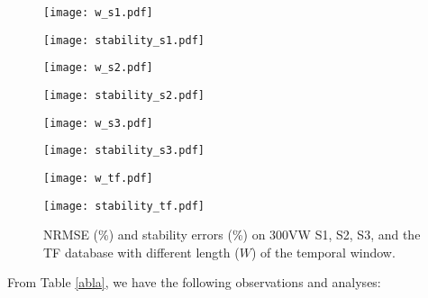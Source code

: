 \documentclass[review]{elsarticle}
\begin{document}
\begin{figure}[h]
\centering	
\begin{minipage}{0.48\linewidth}
	\centering
	\texttt{[image: w\_s1.pdf]}
\end{minipage}%
\begin{minipage}{0.48\linewidth}
	\centering
	\texttt{[image: stability\_s1.pdf]}
\end{minipage}%

\begin{minipage}{0.48\linewidth}
	\centering
	\texttt{[image: w\_s2.pdf]}
\end{minipage}
\begin{minipage}{0.48\linewidth}
	\centering
	\texttt{[image: stability\_s2.pdf]}
\end{minipage}

\begin{minipage}{0.48\linewidth}
	\centering
	\texttt{[image: w\_s3.pdf]}
\end{minipage}
\begin{minipage}{0.48\linewidth}
	\centering
	\texttt{[image: stability\_s3.pdf]}
\end{minipage}

\begin{minipage}{0.48\linewidth}
	\centering
	\texttt{[image: w\_tf.pdf]}
\end{minipage}
\begin{minipage}{0.48\linewidth}
	\centering
	\texttt{[image: stability\_tf.pdf]}
\end{minipage}
\caption{NRMSE (\%) and stability errors (\%) on 300VW S1, S2, S3, and the TF database with different length ($W$) of the temporal window.}
\label{fig:w}
\end{figure}

From Table \ref{abla}, we have the following observations and analyses:
\end{document}
